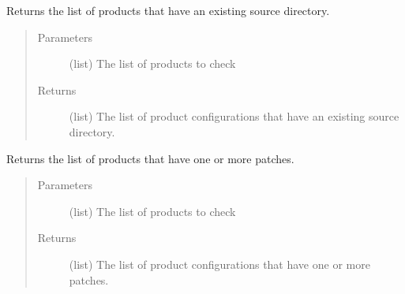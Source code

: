 \documentclass[a4paper,10pt,english]{sphinxmanual}
\begin{document}
\begin{fulllineitems}
\label{\detokenize{apidoc_commands/commands:commands.prepare.find_products_already_getted}}
Returns the list of products that have an existing source directory.
\begin{quote}\begin{description}
\item[{Parameters}] \leavevmode
{} \textendash{} (list) The list of products to check

\item[{Returns}] \leavevmode
(list) 
The list of product configurations 
that have an existing source directory.

\end{description}\end{quote}

\end{fulllineitems}


\begin{fulllineitems}
\label{\detokenize{apidoc_commands/commands:commands.prepare.find_products_with_patchs}}
Returns the list of products that have one or more patches.
\begin{quote}\begin{description}
\item[{Parameters}] \leavevmode
{} \textendash{} (list) The list of products to check

\item[{Returns}] \leavevmode
(list) 
The list of product configurations 
that have one or more patches.

\end{description}\end{quote}

\end{fulllineitems}

\end{document}
